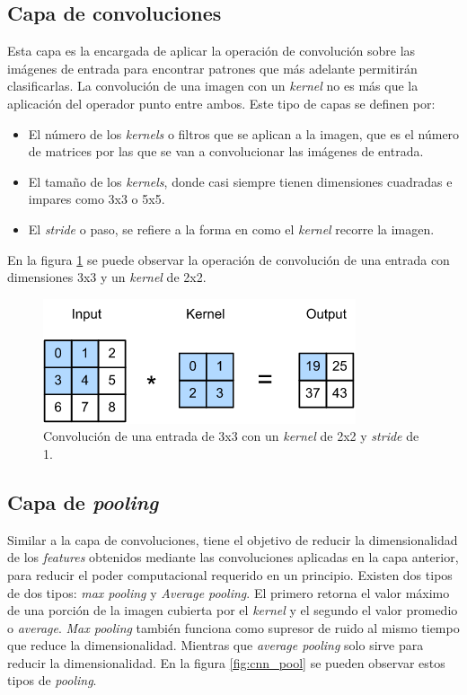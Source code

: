 \subsection{Capa de convoluciones}
Esta capa es la encargada de aplicar la operación de convolución sobre las imágenes de entrada para encontrar patrones que más adelante permitirán clasificarlas. La convolución de una imagen con un \textit{kernel} no es más que la aplicación del operador punto entre ambos. Este tipo de capas se definen por:
\begin{itemize}
	\item El número de los \textit{kernels} o filtros que se aplican a la imagen, que es el número de matrices por las que se van a convolucionar las imágenes de entrada.
	\item El tamaño de los \textit{kernels}, donde casi siempre tienen dimensiones cuadradas e impares como 3x3 o 5x5.
	\item El \textit{stride} o paso, se refiere a la forma en como el \textit{kernel} recorre la imagen.
\end{itemize}

En la figura \ref{fig:cnn_conv} se puede observar la operación de convolución de una entrada con dimensiones 3x3 y un \textit{kernel} de 2x2.

\begin{figure}[h]
	\centering
	\includegraphics[scale=0.7]{./Figures/cnn_conv.png}
	\caption{Convolución de una entrada de 3x3 con un \textit{kernel} de 2x2 y \textit{stride} de 1\protect\footnotemark.}
	\label{fig:cnn_conv}
\end{figure}

\subsection{Capa de \textit{pooling}}
Similar a la capa de convoluciones, tiene el objetivo de reducir la dimensionalidad de los \textit{features} obtenidos mediante las convoluciones aplicadas en la capa anterior, para reducir el poder computacional requerido en un principio. Existen dos tipos de dos tipos: \textit{max pooling} y \textit{Average pooling}. El primero retorna el valor máximo de una porción de la imagen cubierta por el \textit{kernel} y el segundo el valor promedio o \textit{average}. \textit{Max pooling} también funciona como supresor de ruido al mismo tiempo que reduce la dimensionalidad. Mientras que \textit{average pooling} solo sirve para reducir la dimensionalidad. En la figura \ref{fig:cnn_pool} se pueden observar estos tipos de \textit{pooling}.

